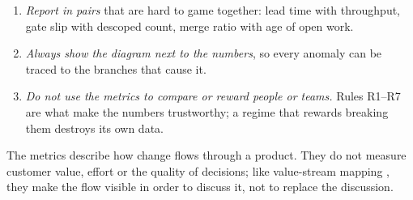 \begin{enumerate}[leftmargin=*,itemsep=2pt]
  \item \emph{Report in pairs} that are hard to game together: lead time
    with throughput, gate slip with descoped count, merge ratio with age
    of open work.
  \item \emph{Always show the diagram next to the numbers}, so every
    anomaly can be traced to the branches that cause it.
  \item \emph{Do not use the metrics to compare or reward people or
    teams.} Rules R1--R7 are what make the numbers trustworthy; a regime
    that rewards breaking them destroys its own data.
\end{enumerate}

\noindent The metrics describe how change flows through a product. They do
not measure customer value, effort or the quality of decisions; like
value-stream mapping \citep{rother1999lts}, they make the flow visible in
order to discuss it, not to replace the discussion.
